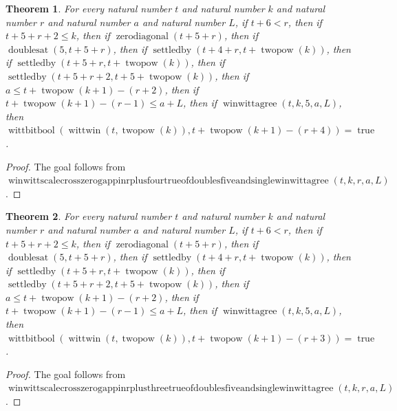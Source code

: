 \documentclass[11pt]{article}
\newtheorem{theorem}{Theorem}[section]
\theoremstyle{definition}
\begin{document}
\begin{theorem}
\label{ll:paper:winwitt-scale-cross-zero-gap-pin-r-plus-four-true-of-doubles-five-and-single-winwittagree}
For every natural number \(t\) and natural number \(k\) and natural number \(r\) and natural number \(a\) and natural number \(L\), if \(t + 6 < r\), then if \(t + 5 + r + 2 \le k\), then if \(\operatorname{zerodiagonal}(t + 5 + r)\), then if \(\operatorname{doublesat}(5, t + 5 + r)\), then if \(\operatorname{settledby}(t + 4 + r, t + \operatorname{twopow}(k))\), then if \(\operatorname{settledby}(t + 5 + r, t + \operatorname{twopow}(k))\), then if \(\operatorname{settledby}(t + 5 + r + 2, t + 5 + \operatorname{twopow}(k))\), then if \(a \le t + \operatorname{twopow}(k + 1) - (r + 2)\), then if \(t + \operatorname{twopow}(k + 1) - (r - 1) \le a + L\), then if \(\operatorname{winwittagree}(t, k, 5, a, L)\), then \(\operatorname{wittbitbool}(\operatorname{wittwin}(t, \operatorname{twopow}(k)), t + \operatorname{twopow}(k + 1) - (r + 4)) = \operatorname{true}\).
\end{theorem}
\begin{proof}
The goal follows from \(\operatorname{winwittscalecrosszerogappinrplusfourtrueofdoublesfiveandsinglewinwittagree}(t, k, r, a, L)\).
\end{proof}
\begin{theorem}
\label{ll:paper:winwitt-scale-cross-zero-gap-pin-r-plus-three-true-of-doubles-five-and-single-winwittagree}
For every natural number \(t\) and natural number \(k\) and natural number \(r\) and natural number \(a\) and natural number \(L\), if \(t + 6 < r\), then if \(t + 5 + r + 2 \le k\), then if \(\operatorname{zerodiagonal}(t + 5 + r)\), then if \(\operatorname{doublesat}(5, t + 5 + r)\), then if \(\operatorname{settledby}(t + 4 + r, t + \operatorname{twopow}(k))\), then if \(\operatorname{settledby}(t + 5 + r, t + \operatorname{twopow}(k))\), then if \(\operatorname{settledby}(t + 5 + r + 2, t + 5 + \operatorname{twopow}(k))\), then if \(a \le t + \operatorname{twopow}(k + 1) - (r + 2)\), then if \(t + \operatorname{twopow}(k + 1) - (r - 1) \le a + L\), then if \(\operatorname{winwittagree}(t, k, 5, a, L)\), then \(\operatorname{wittbitbool}(\operatorname{wittwin}(t, \operatorname{twopow}(k)), t + \operatorname{twopow}(k + 1) - (r + 3)) = \operatorname{true}\).
\end{theorem}
\begin{proof}
The goal follows from \(\operatorname{winwittscalecrosszerogappinrplusthreetrueofdoublesfiveandsinglewinwittagree}(t, k, r, a, L)\).
\end{proof}
\end{document}
